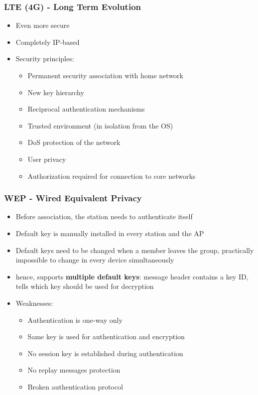 \subsubsection{LTE (4G) - Long Term Evolution}
\begin{itemize}
	\item Even more secure
	\item Completely IP-based
	\item Security principles:
	\begin{itemize}
		\item Permanent security association with home network
		\item New key hierarchy
		\item Reciprocal authentication mechanisms
		\item Trusted environment (in isolation from the OS)
		\item DoS protection of the network
		\item User privacy
		\item Authorization required for connection to core networks
	\end{itemize}
\end{itemize}
\subsubsection{WEP - Wired Equivalent Privacy}
\begin{itemize}
	\item Before association, the station needs to authenticate itself
	\item Default key is manually installed in every station and the AP
	\item Default keys need to be changed when a member leaves the group, practically impossible to change in every device simultaneously
	\item hence, supports \textbf{multiple default keys}: message header contains a key ID, tells which key should be used for decryption
	\item Weaknesses:
	\begin{itemize}
		\item Authentication is one-way only
		\item Same key is used for authentication and encryption
		\item No session key is established during authentication
		\item No replay messages protection
		\item Broken authentication protocol
	\end{itemize}
\end{itemize}

